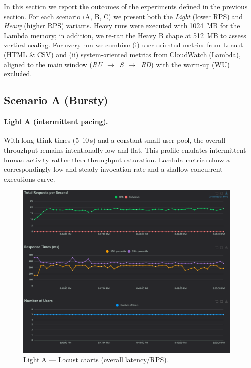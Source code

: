 \documentclass[11pt,a4paper]{article}
\begin{document}
In this section we report the outcomes of the experiments defined in the previous section. For each scenario (A, B, C) we present both the \emph{Light} (lower RPS) and \emph{Heavy} (higher RPS) variants. Heavy runs were executed with \SI{1024}{MB} for the Lambda memory; in addition, we re-ran the Heavy B shape at \SI{512}{MB} to assess vertical scaling. For every run we combine (i) user-oriented metrics from Locust (HTML \& CSV) and (ii) system-oriented metrics from CloudWatch (Lambda), aligned to the main window (\emph{RU}~$\rightarrow$~\emph{S}~$\rightarrow$~\emph{RD}) with the warm-up (WU) excluded.

\subsection{Scenario A (Bursty)}\label{subsec:resA}

\paragraph{Light A (intermittent pacing).}
With long think times (5--10\,s) and a constant small user pool, the overall throughput remains intentionally low and flat. This profile emulates intermittent human activity rather than throughput saturation. Lambda metrics show a correspondingly low and steady invocation rate and a shallow concurrent-executions curve.

\begin{figure}[h!] \centering
  \includegraphics[width=\linewidth]{"figures/lA - Charts.png"}
  \caption{Light A --- Locust charts (overall latency/RPS).}
\end{figure}
\end{document}
